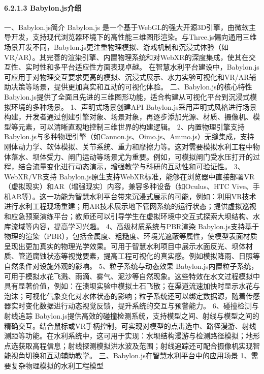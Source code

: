 {\paragraph{6.2.1.3 Babylon.js介绍}\label{babylon.jsux4ecbux7ecd} 一、Babylon.js简介 Babylon.js
是一个基于WebGL的强大开源3D引擎，由微软主导开发，支持现代浏览器环境下的高性能三维图形渲染。与Three.js偏向通用三维场景开发不同，Babylon.js更注重物理模拟、游戏机制和沉浸式体验（如VR/AR）。其完善的渲染引擎、内置物理系统和对WebXR的深度集成，使其在交互性、实时性和多平台适应性方面表现卓越。
在智慧水利平台建设中，Babylon.js可应用于对物理交互要求更高的模拟、沉浸式展示、水力实验可视化和VR/AR辅助决策等场景，提供更加真实和互动的可视化体验。 二、Babylon.js的核心特性
Babylon.js提供了全面且先进的三维图形功能，适合构建从可视化平台到沉浸式模拟环境的多种场景。 1、声明式场景创建API
Babylon.js采用声明式风格进行场景构建，开发者通过创建引擎对象、场景对象，再逐步添加光源、材质、摄像机、模型等元素，可以清晰直观地控制三维世界的构建逻辑。 2、内置物理引擎支持
Babylon.js与多种物理引擎（如Cannon.js、Oimo.js、Ammo.js）无缝集成，支持刚体动力学、软体模拟、关节系统、重力和摩擦力等。这对需要模拟水利工程中物体落水、坝体受力、闸门运动等场景尤为重要。例如，可模拟闸门受水压打开的过程，结合流量变化进行动态演示，增强教学与科研的互动性和可验证性。
3、WebXR/VR支持 Babylon.js原生支持WebXR标准，能够在浏览器中直接部署VR（虚拟现实）和AR（增强现实）内容，兼容多种设备（如Oculus、HTC
Vive、手机AR等）。这一功能为智慧水利平台带来沉浸式展示的可能，例如：利用VR技术进行水利工程现场重建；用AR技术展示地下管网系统的运行状态；提供虚拟巡视和应急预案演练平台；教师还可以引导学生在虚拟环境中交互式探索大坝结构、水库流域等内容，提高学习兴趣。
4、高级材质系统与PBR渲染
Babylon.js支持基于物理的渲染（PBR），包括金属度、粗糙度、环境光遮蔽等属性，使模型表面材质呈现出更加真实的物理光学效果。可用于智慧水利项目中展示水面反光、坝体材质、管道腐蚀状态等视觉要素，提高工程可视化的真实感。例如模拟降雨、日照等自然条件对设施外观的影响。
5、粒子系统与动态效果
Babylon.js内置粒子系统，可用于模拟水花飞溅、雨滴、雾气、泥沙等自然现象。这些特效在水文过程模拟中具有显著价值，例如：在溃坝实验中模拟土石飞散；在渠道流速加快时显示水花与泡沫；可视化气象变化对水体状态的影响；粒子系统还可以绑定数据源，随着传感器实时变化数据进行动态视觉反馈，提升系统的交互与预警能力。
6、碰撞检测与射线追踪
Babylon.js提供高效的碰撞检测系统，支持模型之间、射线与模型之间的精确交互。结合鼠标或VR手柄控制，可实现对模型的点击选中、路径漫游、射线测距等功能。在水利系统中，这可用于实现：水坝结构漫游与检测路径模拟；地形点选获取高程信息；射线探测模拟洪水波及范围；射线追踪还可配合摄像机实现智能视角切换和互动辅助教学。
三、Babylon.js在智慧水利平台中的应用场景 1、需要复杂物理模拟的水利工程模型
}
